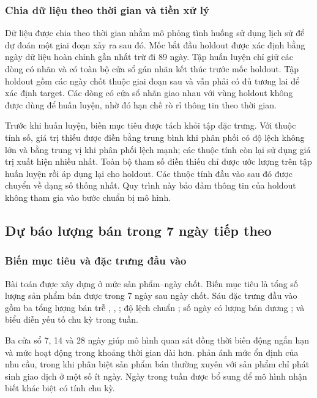 \subsubsection{Chia dữ liệu theo thời gian và tiền xử lý}

Dữ liệu được chia theo thời gian nhằm mô phỏng tình huống sử dụng lịch sử để dự đoán một giai đoạn xảy ra sau đó. Mốc bắt đầu holdout được xác định bằng ngày dữ liệu hoàn chỉnh gần nhất trừ đi 89 ngày. Tập huấn luyện chỉ giữ các dòng có nhãn và có toàn bộ cửa sổ gán nhãn kết thúc trước mốc holdout. Tập holdout gồm các ngày chốt thuộc giai đoạn sau và vẫn phải có đủ tương lai để xác định target. Các dòng có cửa sổ nhãn giao nhau với vùng holdout không được dùng để huấn luyện, nhờ đó hạn chế rò rỉ thông tin theo thời gian.

Trước khi huấn luyện, biến mục tiêu được tách khỏi tập đặc trưng. Với thuộc tính số, giá trị thiếu được điền bằng trung bình khi phân phối có độ lệch không lớn và bằng trung vị khi phân phối lệch mạnh; các thuộc tính còn lại sử dụng giá trị xuất hiện nhiều nhất. Toàn bộ tham số điền thiếu chỉ được ước lượng trên tập huấn luyện rồi áp dụng lại cho holdout. Các thuộc tính đầu vào sau đó được chuyển về dạng số thống nhất. Quy trình này bảo đảm thông tin của holdout không tham gia vào bước chuẩn bị mô hình.

\subsection{Dự báo lượng bán trong 7 ngày tiếp theo}

\subsubsection{Biến mục tiêu và đặc trưng đầu vào}

Bài toán được xây dựng ở mức sản phẩm--ngày chốt. Biến mục tiêu là tổng số lượng sản phẩm bán được trong 7 ngày sau ngày chốt. Sáu đặc trưng đầu vào gồm ba tổng lượng bán trễ , , ; độ lệch chuẩn ; số ngày có lượng bán dương ; và  biểu diễn yếu tố chu kỳ trong tuần.

Ba cửa sổ 7, 14 và 28 ngày giúp mô hình quan sát đồng thời biến động ngắn hạn và mức hoạt động trong khoảng thời gian dài hơn.  phản ánh mức ổn định của nhu cầu, trong khi  phân biệt sản phẩm bán thường xuyên với sản phẩm chỉ phát sinh giao dịch ở một số ít ngày. Ngày trong tuần được bổ sung để mô hình nhận biết khác biệt có tính chu kỳ.

